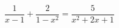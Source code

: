 \begin{ex}
	\begin{condition}
		\( \dfrac{1}{x-1}+\dfrac{2}{1-x^2}=\dfrac{5}{x^2+2x+1} \)
	\end{condition}
\end{ex}